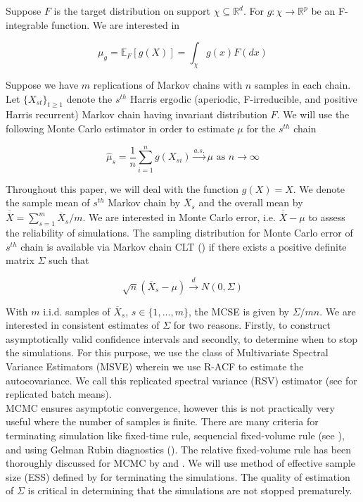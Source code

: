 \documentclass[12pt]{article}
\begin{document}
Suppose $F$ is the target distribution on support $\chi \subseteq \mathbb{R}^d$. For $g:\chi \longrightarrow \mathbb{R}^p$ be an F-integrable function. We are interested in

\[
\mu_g = \mathbb{E}_F[g(X)] = \int_{\chi}g(x)F(dx)
\]

Suppose we have $m$ replications of Markov chains with $n$ samples in each chain. Let $\{X_{st}\}_{t \geq 1}$ denote the $s^{th}$ Harris ergodic (aperiodic, F-irreducible, and positive Harris recurrent) Markov chain having invariant distribution $F$. We will use the following Monte Carlo estimator in order to estimate $\mu$ for the $s^{th}$ chain

\[
\hat{\mu}_s = \dfrac{1}{n}\sum_{i = 1}^{n} g(X_{si}) \xrightarrow{a.s.} \mu \textrm{ as } n \to \infty
\]

Throughout this paper, we will deal with the function $g(X) = X$. We denote the sample mean of $s^{th}$ Markov chain by $\overline{X}_s$ and the overall mean by $\overline{\overline{X}} = \sum_{s = 1}^{m}\overline{X}_s/m$. We are interested in Monte Carlo error, i.e. $\overline{\overline{X}} - \mu$ to assess the reliability of simulations. The sampling distribution for Monte Carlo error of $s^{th}$ chain is available via Markov chain CLT (\cite{jones2004markov}) if there exists a positive definite matrix $\Sigma$ such that

\[
\sqrt{n}(\overline{X}_s-\mu) \xrightarrow{d} N(0,\Sigma)
\]

 With $m$ i.i.d. samples of $\overline{X}_s$, $s \in \{1,..., m\}$, the MCSE is given by $\Sigma/mn$. We are interested in consistent estimates of $\Sigma$ for two reasons. Firstly, to construct asymptotically valid confidence intervals and secondly, to determine when to stop the simulations. For this purpose, we use the class of Multivariate Spectral Variance Estimators (MSVE) wherein we use R-ACF to estimate the autocovariance. We call this replicated spectral variance (RSV) estimator (see \cite{arg:and:2006} for replicated batch means). \\
 
MCMC ensures asymptotic convergence, however this is not practically very useful where the number of samples is finite. There are many criteria for terminating simulation like fixed-time rule, sequencial fixed-volume rule (see \cite{glynn1992asymptotic}), and using Gelman Rubin diagnostics (\cite{gelman1992inference}). The relative fixed-volume rule has been thoroughly discussed for MCMC by \cite{flegal2015relative} and \cite{gong2016practical}. We will use method of effective sample size (ESS) defined by \cite{vats2019multivariate} for terminating the simulations. The quality of estimation of $\Sigma$ is critical in determining that the simulations are not stopped prematurely. \\
 
\end{document}
